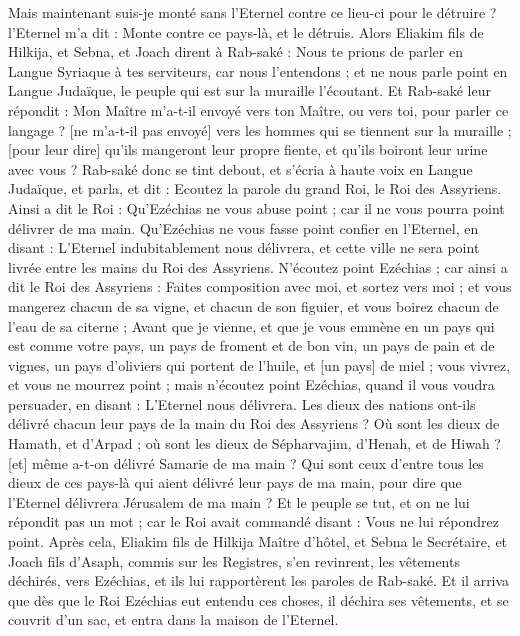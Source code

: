 \begin{multicols}{2}
Mais maintenant suis-je monté sans l'Eternel contre ce lieu-ci pour le détruire ? l'Eternel m'a dit : Monte contre ce pays-là, et le détruis.
Alors Eliakim fils de Hilkija, et Sebna, et Joach dirent à Rab-saké : Nous te prions de parler en Langue Syriaque à tes serviteurs, car nous l'entendons ; et ne nous parle point en Langue Judaïque, le peuple qui est sur la muraille l'écoutant.
Et Rab-saké leur répondit : Mon Maître m'a-t-il envoyé vers ton Maître, ou vers toi, pour parler ce langage ? [ne m'a-t-il pas envoyé] vers les hommes qui se tiennent sur la muraille ; [pour leur dire] qu'ils mangeront leur propre fiente, et qu'ils boiront leur urine avec vous ?
Rab-saké donc se tint debout, et s'écria à haute voix en Langue Judaïque, et parla, et dit : Ecoutez la parole du grand Roi, le Roi des Assyriens.
Ainsi a dit le Roi : Qu'Ezéchias ne vous abuse point ; car il ne vous pourra point délivrer de ma main.
Qu'Ezéchias ne vous fasse point confier en l'Eternel, en disant : L'Eternel indubitablement nous délivrera, et cette ville ne sera point livrée entre les mains du Roi des Assyriens.
N'écoutez point Ezéchias ; car ainsi a dit le Roi des Assyriens : Faites composition avec moi, et sortez vers moi ; et vous mangerez chacun de sa vigne, et chacun de son figuier, et vous boirez chacun de l'eau de sa citerne ;
Avant que je vienne, et que je vous emmène en un pays qui est comme votre pays, un pays de froment et de bon vin, un pays de pain et de vignes, un pays d'oliviers qui portent de l'huile, et [un pays] de miel ; vous vivrez, et vous ne mourrez point ; mais n'écoutez point Ezéchias, quand il vous voudra persuader, en disant : L'Eternel nous délivrera.
Les dieux des nations ont-ils délivré chacun leur pays de la main du Roi des Assyriens ?
Où sont les dieux de Hamath, et d'Arpad ; où sont les dieux de Sépharvajim, d'Henah, et de Hiwah ? [et] même a-t-on délivré Samarie de ma main ?
Qui sont ceux d'entre tous les dieux de ces pays-là qui aient délivré leur pays de ma main, pour dire que l'Eternel délivrera Jérusalem de ma main ?
Et le peuple se tut, et on ne lui répondit pas un mot ; car le Roi avait commandé disant : Vous ne lui répondrez point.
Après cela, Eliakim fils de Hilkija Maître d'hôtel, et Sebna le Secrétaire, et Joach fils d'Asaph, commis sur les Registres, s'en revinrent, les vêtements déchirés, vers Ezéchias, et ils lui rapportèrent les paroles de Rab-saké.
\VerseOne{}Et il arriva que dès que le Roi Ezéchias eut entendu ces choses, il déchira ses vêtements, et se couvrit d'un sac, et entra dans la maison de l'Eternel.

\end{multicols}
